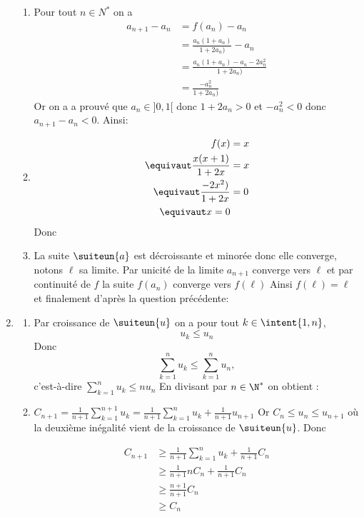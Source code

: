 \begin{correction}
\begin{enumerate}
\begin{enumerate}
\item  Pour tout $n\in N^*$ on a 
\begin{eqnarray*}
a_{n+1} -a_n &= f(a_n) -a_n\\
					&= \frac{a_n(1+a_n)}{1+2a_n)} - a_n\\
					&=  \frac{a_n(1+a_n) - a_n -2a_n^2}{1+2a_n)} \\
					&=  \frac{-a_n^2}{1+2a_n)} 
\end{eqnarray*}
Or on a a prouvé que $a_n\in ]0,1[$ donc $1+2a_n>0$ et $-a_n^2<0$ donc 
$a_{n+1}-a_n<0$. Ainsi: 

\item
\begin{eqnarray}
f(x) &= x\\
\equivaut \frac{x(x+1)}{1+2x}&=x\\
\equivaut \frac{-2x^2)}{1+2x}&=0\\ 
\equivaut x=0 
\end{eqnarray}
Donc 


\item La suite $\suiteun{a}$ est décroissante et minorée donc elle converge, notons $\ell$ sa limite. Par unicité de la limite $a_{n+1} $ converge vers $\ell$ et par continuité de $f$ la suite $f(a_n) $ converge vers $f(\ell)$ 
Ainsi $f(\ell)=\ell$ et finalement d'après la question précédente:  

\end{enumerate}
\item \begin{enumerate}
\item Par croissance de $\suiteun{u}$ on a pour  tout $k\in \intent{1,n}$, 
$$u_k \leq u_n$$
Donc $$\sum_{k=1}^n u_k \leq \sum_{k=1}^n u_n,$$
c'est-à-dire $\sum_{k=1}^n u_k \leq n u_n$
En divisant par $n\in \N^*$ on obtient :

\item 
$C_{n+1} =\frac{1}{n+1} \sum_{k=1}^{n+1} u_k = \frac{1}{n+1} \sum_{k=1}^{n} u_k +\frac{1}{n+1} u_{n+1}$
Or $C_n \leq u_n \leq u_{n+1} $ où la deuxième inégalité vient de la croissance de $\suiteun{u}$. Donc

\begin{eqnarray*}
C_{n+1} &\geq \frac{1}{n+1} \sum_{k=1}^{n} u_k + \frac{1}{n+1} C_n\\
			&\geq \frac{1}{n+1} nC_n + \frac{1}{n+1} C_n\\
			&\geq \frac{n+1}{n+1} C_n \\
			&\geq C_n	
\end{eqnarray*}


\end{enumerate}
\end{enumerate}
\end{correction}
